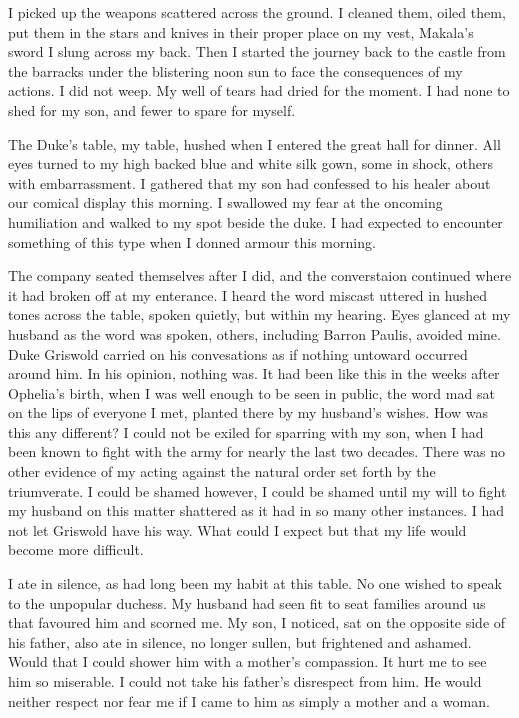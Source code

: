 \documentclass{article}
\begin{document}
I picked up the weapons scattered across the ground. I cleaned them, oiled them, put them in the stars and knives in their proper place on my vest, Makala's sword I slung across my back. Then I started the journey back to the castle from the barracks under the blistering noon sun to face the consequences of my actions. I did not weep. My well of tears had dried for the moment. I had none to shed for my son, and fewer to spare for myself.

\vspace{.5cm}

The Duke's table, my table, hushed when I entered the great hall for dinner. All eyes turned to my high backed blue and white silk gown, some in shock, others with embarrassment. I gathered that my son had confessed to his healer about our comical display this morning. I swallowed my fear at the oncoming humiliation and walked to my spot beside the duke. I had expected to encounter something of this type when I donned armour this morning. 

The company seated themselves after I did, and the converstaion continued where it had broken off at my enterance. I heard the word miscast uttered in hushed tones across the table, spoken quietly, but within my hearing. Eyes glanced at my husband as the word was spoken, others, including Barron Paulis, avoided mine. Duke Griswold carried on his convesations as if nothing untoward occurred around him. In his opinion, nothing was. It had been like this in the weeks after Ophelia's birth, when I was well enough to be seen in public, the word mad sat on the lips of everyone I met, planted there by my husband's wishes. How was this any different? I could not be exiled for sparring with my son, when I had been known to fight with the army for nearly the last two decades. There was no other evidence of my acting against the natural order set forth by the triumverate. I could be shamed however, I could be shamed until my will to fight my husband on this matter shattered as it had in so many other instances. I had not let Griswold have his way. What could I expect but that my life would become more difficult.

I ate in silence, as had long been my habit at this table. No one wished to speak to the unpopular duchess. My husband had seen fit to seat families around us that favoured him and scorned me. My son, I noticed, sat on the opposite side of his father, also ate in silence, no longer sullen, but frightened and ashamed. Would that I could shower him with a mother's compassion. It hurt me to see him so miserable. I could not take his father's disrespect from him. He would neither respect nor fear me if I came to him as simply a mother and a woman. 
\end{document}
